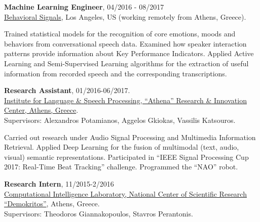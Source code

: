 \documentclass[letterpaper]{article}
\renewenvironment{itemize}{
  \begin{list}{}{
    \setlength{\leftmargin}{1.5em}
  }
}{
  \end{list}
}
\begin{document}
\begin{itemize}

\item 
    \textbf{Machine Learning Engineer}, 04/2016 - 08/2017\\ 
    \href{https://behavioralsignals.com/}{Behavioral Signals}, Los Angeles, US (working remotely from Athens, Greece).
    \begin{itemize}
    \item Trained statistical models for the recognition of core emotions, moods and behaviors from conversational speech data. Examined how speaker interaction patterns provide information about Key Performance Indicators. Applied Active Learning and Semi-Supervised Learning algorithms for the extraction of useful information from recorded speech and the corresponding transcriptions. 
    \end{itemize}


    
    

\item 
    \textbf{Research Assistant}, 01/2016-06/2017.\\
    \href{http://www.ilsp.gr/en}{Institute for Language \& Speech Processing, ``Athena'' Research \& Innovation Center, Athens, Greece}.\\
    Supervisors: Alexandros Potamianos, Aggelos Gkiokas, Vassilis Katsouros.


    \begin{itemize}
    \item 
        Carried out research under Audio Signal Processing and Multimedia Information Retrieval. Applied Deep Learning for the fusion of multimodal (text, audio, visual) semantic representations. Participated in ``IEEE Signal Processing Cup 2017: Real-Time Beat Tracking'' challenge. Programmed the ``NAO'' robot. 
    \end{itemize}
\iffalse
\item 
    \textbf{Lab \& Research Assistant}, 11/2015-06/2017\\
    Computer Vision, Speech Communication \& Signal Processing Lab, NTUA, Athens, Greece.\\
    Supervisors: Alexandros Potamianos, and Petros Maragos

    \begin{itemize}
    \item 
        Developed Audio-Based Distributional Semantic Models     (DSMs).
    \item 
        Assisted with the lab sessions of the course ``Pattern Recognition with Emphasis on Speech Recognition''.
    \end{itemize}
\fi
\item 
    \textbf{Research Intern}, 11/2015-2/2016\\
    \href{https://www.iit.demokritos.gr/cil/}{Computational Intelligence Laboratory, National Center of Scientific Research ``Demokritos''}, Athens, Greece.\\
    Supervisors: Theodoros Giannakopoulos, Stavros Perantonis.



\end{itemize}
\end{document}
